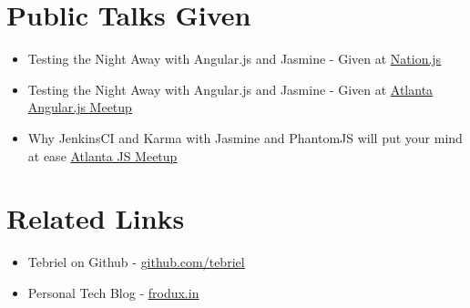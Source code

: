 \documentclass[margin]{res}
\begin{document}
\begin{resume}
\section{Public Talks Given}
    \begin{itemize}
        \item Testing the Night Away with Angular.js and Jasmine - Given at
            \href{http://nationjs.com/}{\underline{Nation.js}}
        \item Testing the Night Away with Angular.js and Jasmine - Given at
            \href{http://www.meetup.com/AngularJS-ATL/}{\underline{Atlanta
            Angular.js Meetup}}
        \item Why JenkinsCI and Karma with Jasmine and PhantomJS will put your
            mind at ease
            \href{http://www.meetup.com/AtlantaJavaScript/}{\underline{Atlanta
            JS Meetup}}
    \end{itemize}

\section{Related Links}
    \begin{itemize}
        \item Tebriel on Github - \href{https://github.com/tebriel}{\underline{github.com/tebriel}}
        \item Personal Tech Blog - \href{http://frodux.in/}{\underline{frodux.in}}
    \end{itemize}

\end{resume}
\end{document}
